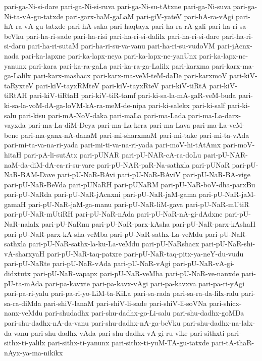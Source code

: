 {pari-ga-Ni-si-dare
pari-ga-Ni-si-ruva
pari-ga-Ni-su-tAtxne
pari-ga-Ni-suva
pari-ga-Ni-ta-vA-gu-tatxde
pari-garx-haM-gaLaM
pari-giV-yateV
pari-hA-ra-vAgi
pari-hA-ra-vA-gu-tatxde
pari-hA-saka
pari-haqtayx
pari-ha-ra-rA-gali
pari-ha-ri-sa-beVku
pari-ha-ri-sade
pari-ha-risi
pari-ha-ri-si-dalilx
pari-ha-ri-si-dare
pari-ha-ri-si-daru
pari-ha-ri-sutaM
pari-ha-ri-su-va-vanu
pari-ha-ri-su-vudoVM
pari-jAcnx-nada
pari-ka-lapxne
pari-ka-lapx-neya
pari-ka-lapx-ne-yanUnx
pari-ka-lapx-ne-yanunx
pari-kara
pari-ka-ra-gaLa
pari-ka-ra-ga-Lalilx
pari-karxma
pari-karx-ma-ga-Lalilx
pari-karx-mashacx
pari-karx-ma-veM-teM-daDe
pari-karxmoV
pari-kiV-taRyxteV
pari-kiV-tayxRMteV
pari-kiV-tayxRteV
pari-kiV-tiRtA
pari-kiV-tiRtAH
pari-kiV-tiRtaH
pari-kiV-tiR-tamf
pari-ki-sa-la-mA-gaR-veM-buda
pari-ki-sa-la-voM-dA-ga-loVM-kA-ra-meM-de-nipa
pari-ki-salekx
pari-ki-salf
pari-ki-salu
pari-kisu
pari-mA-NoV-daka
pari-maLa
pari-ma-Lada
pari-ma-La-darx-vayxda
pari-ma-La-diM-Deya
pari-ma-La-kera
pari-ma-Lava
pari-ma-La-veM-bene
pari-ma-ganx-nA-danaM
pari-mi-sharxmaM
pari-mi-take
pari-mi-ta-vAda
pari-mi-ta-va-na-ri-yada
pari-mi-ti-va-na-ri-yada
pari-moV-hi-tAtAmx
pari-moV-hitaH
pari-pA-li-sutAtx
pari-pUNAR
pari-pU-NAR-cA-ra-doLu
pari-pU-NAR-naM-da-diM-dA-ca-ri-su-vare
pari-pU-NAR-paR-Na-sathxla
pari-pUNaR
pari-pU-NaR-BAM-Dave
pari-pU-NaR-BAvi
pari-pU-NaR-BAviV
pari-pU-NaR-BA-vige
pari-pU-NaR-BeVda
pari-pUNaRH
pari-pUNaRM
pari-pU-NaR-boV-dha-parxBu
pari-pU-NaRda
pari-pU-NaR-jAcnxni
pari-pU-NaR-jaM-gama
pari-pU-NaR-jaM-gamaH
pari-pU-NaR-jaM-ga-manu
pari-pU-NaR-liM-gava
pari-pU-NaR-mUtiR
pari-pU-NaR-mUtiRH
pari-pU-NaR-nAda
pari-pU-NaR-nA-gi-dAdxne
pari-pU-NaR-nalalx
pari-pU-NaRnu
pari-pU-NaR-parx-kAsha
pari-pU-NaR-parx-kAshaH
pari-pU-NaR-parx-kA-sha-veMba
pari-pU-NaR-sathx-La-veMdu
pari-pU-NaR-sathxla
pari-pU-NaR-sathx-la-ku-La-veMdu
pari-pU-NaRshacx
pari-pU-NaR-shi-vA-sharxyaH
pari-pU-NaR-taq-patxre
pari-pU-NaR-taq-pitx-ya-neY-du-vudu
pari-pU-NaRte
pari-pU-NaR-vAda
pari-pU-NaR-vAgi
pari-pU-NaR-vA-gi-didxtutx
pari-pU-NaR-vapapx
pari-pU-NaR-veMba
pari-pU-NaR-ve-nanxde
pari-pU-ta-mAda
pari-pa-kavxte
pari-pa-kavx-vAgi
pari-pa-kavxva
pari-pa-ri-yAgi
pari-pa-ri-yalu
pari-pa-ri-yo-LiM-ta-KiLa
pari-sa-rada
pari-sa-ra-da-lilx-ralu
pari-sa-ra-diMda
pari-shiV-lanaM
pari-shiV-li-sade
pari-shiV-li-soVNa
pari-shicx-nanx-veMdu
pari-shudadhx
pari-shu-dadhx-go-Li-salu
pari-shu-dadhx-goMDa
pari-shu-dadhx-nA-da-vanu
pari-shu-dadhx-nA-ga-beVku
pari-shu-dadhx-na-lalx-da-vanu
pari-shu-dadhx-vAda
pari-shu-dadhx-vA-gi-ru-vike
pari-sithxti
pari-sithx-ti-yalilx
pari-sithx-ti-yanunx
pari-sithx-ti-yuM-TA-gu-tatxde
pari-tA-thaR-nAyx-ya-ma-nikikx
}
